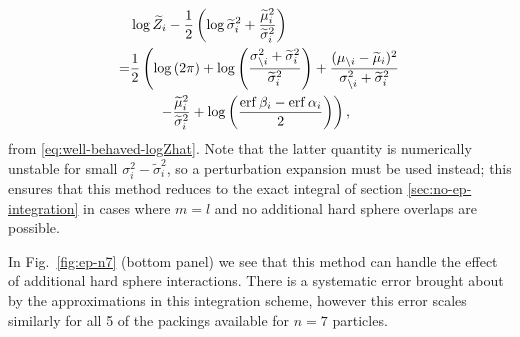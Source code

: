 \documentclass[11pt,twoside]{report}
\begin{document}
\begin{align}
  & \log{\widetilde{Z}_i}
  - \frac{1}{2}
  \left(
  \log{\widetilde{\sigma}_i^2}
  + \frac{\widetilde{\mu}_i^2}{\widetilde{\sigma}_i^2}
  \right)
  \nonumber \\ =&
  \frac{1}{2} \left(
  \log{(2\pi)} +
  \log{\left(\frac{\sigma_{\setminus i}^2 + \widetilde{\sigma}_i^2}{\widetilde{\sigma}_i^2}\right)}
  + \frac{(\mu_{\setminus i} - \widetilde{\mu}_i)^2}{\sigma_{\setminus i}^2 + \widetilde{\sigma}_i^2}
  \right.
  \nonumber \\ & \qquad
  \left.
  - \frac{\widetilde{\mu}_i^2}{\widetilde{\sigma}_i^2}
  + \log{\left(\frac{\operatorname{erf}{\beta_i} - \operatorname{erf}{\alpha_i}}{2}\right)}
  \right),
\end{align}
from \eqref{eq:well-behaved-logZhat}.
Note that the latter quantity is numerically unstable for small $\sigma_i^2 - \widetilde{\sigma}_i^2$, so a perturbation expansion must be used instead; this ensures that this method reduces to the exact integral of section \ref{sec:no-ep-integration} in cases where $m=l$ and no additional hard sphere overlaps are possible.

In Fig.\ \ref{fig:ep-n7} (bottom panel) we see that this method can handle the effect of additional hard sphere interactions.
There is a systematic error brought about by the approximations in this integration scheme, however this error scales similarly for all 5 of the packings available for $n=7$ particles.
\end{document}
